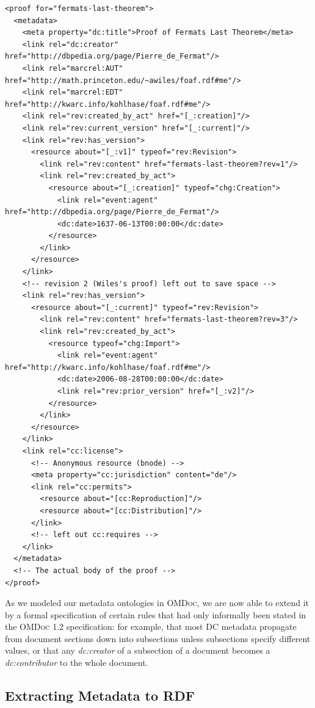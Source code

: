 \documentclass{llncs}
\renewcommand{\omdoc}{\textsc{OMDoc}\xspace}
\begin{document}
\begin{lstlisting}
<proof for="fermats-last-theorem">
  <metadata>
    <meta property="dc:title">Proof of Fermats Last Theorem</meta>
    <link rel="dc:creator" href="http://dbpedia.org/page/Pierre_de_Fermat"/>
    <link rel="marcrel:AUT" href="http://math.princeton.edu/~awiles/foaf.rdf#me"/>
    <link rel="marcrel:EDT" href="http://kwarc.info/kohlhase/foaf.rdf#me"/>
    <link rel="rev:created_by_act" href="[_:creation]"/>
    <link rel="rev:current_version" href="[_:current]"/>
    <link rel="rev:has_version">
      <resource about="[_:v1]" typeof="rev:Revision">
        <link rel="rev:content" href="fermats-last-theorem?rev=1"/>
        <link rel="rev:created_by_act">
          <resource about="[_:creation]" typeof="chg:Creation">
            <link rel="event:agent" href="http://dbpedia.org/page/Pierre_de_Fermat"/>
            <dc:date>1637-06-13T00:00:00</dc:date>
          </resource>
        </link>
      </resource>
    </link>
    <!-- revision 2 (Wiles's proof) left out to save space -->
    <link rel="rev:has_version">
      <resource about="[_:current]" typeof="rev:Revision">
        <link rel="rev:content" href="fermats-last-theorem?rev=3"/>
        <link rel="rev:created_by_act">
          <resource typeof="chg:Import">
            <link rel="event:agent" href="http://kwarc.info/kohlhase/foaf.rdf#me"/>
            <dc:date>2006-08-28T00:00:00</dc:date>
            <link rel="rev:prior_version" href="[_:v2]"/>
          </resource>
        </link>
      </resource>
    </link>
    <link rel="cc:license">
      <!-- Anonymous resource (bnode) -->
      <meta property="cc:jurisdiction" content="de"/>
      <link rel="cc:permits">
        <resource about="[cc:Reproduction]"/>
        <resource about="[cc:Distribution]"/>
      </link>
      <!-- left out cc:requires -->
    </link>
  </metadata>
  <!-- The actual body of the proof -->
</proof>
\end{lstlisting}
\fi

As we modeled our metadata ontologies in \omdoc, we are now able to extend it by a formal
specification of certain rules that had only informally been stated in the \omdoc 1.2
specification: for example, that most DC metadata propagate from document sections down
into subsections unless subsections specify different values, or that any
\textit{dc:creator} of a subsection of a document becomes a \textit{dc:contributor} to the
whole document.

\subsection{Extracting Metadata to RDF}\label{sec:extracting}
\end{document}
